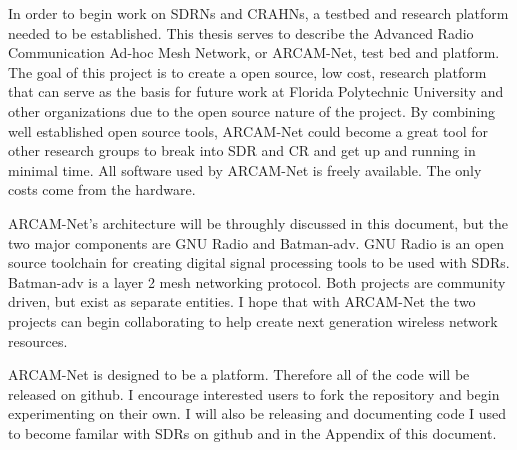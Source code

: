 In order to begin work on SDRNs and CRAHNs, a testbed and research platform needed to be established. This thesis serves to describe the Advanced Radio Communication Ad-hoc Mesh Network, or ARCAM-Net, test bed and platform. The goal of this project is to create a open source, low cost, research platform that can serve as the basis for future work at Florida Polytechnic University and other organizations due to the open source nature of the project. By combining well established open source tools, ARCAM-Net could become a great tool for other research groups to break into SDR and CR and get up and running in minimal time. All software used by ARCAM-Net is freely available. The only costs come from the hardware. 

ARCAM-Net's architecture will be throughly discussed in this document, but the two major components are GNU Radio and Batman-adv. GNU Radio is an open source toolchain for creating digital signal processing tools to be used with SDRs. Batman-adv is a layer 2 mesh networking protocol. Both projects are community driven, but exist as separate entities. I hope that with ARCAM-Net the two projects can begin collaborating to help create next generation wireless network resources. 

ARCAM-Net is designed to be a platform. Therefore all of the code will be released on github. I encourage interested users to fork the repository and begin experimenting on their own. I will also be releasing and documenting code I used to become familar with SDRs on github and in the Appendix of this document.  


